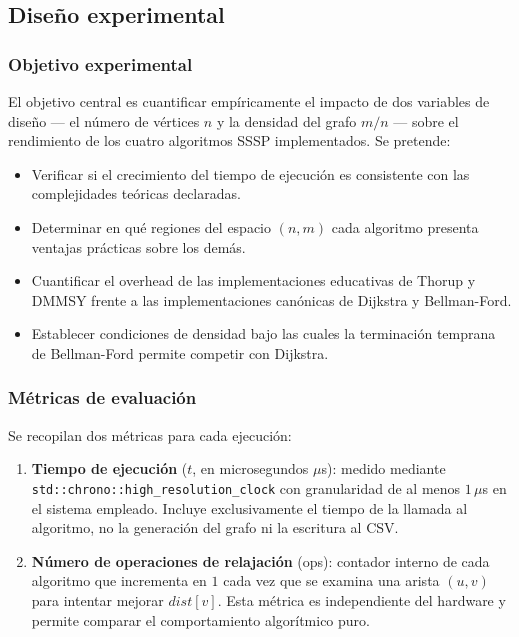 
\subsection{Diseño experimental}

\subsubsection{Objetivo experimental}

El objetivo central es cuantificar empíricamente el impacto de dos variables
de diseño — el número de vértices $n$ y la densidad del grafo $m/n$ — sobre
el rendimiento de los cuatro algoritmos SSSP implementados.
Se pretende:

\begin{itemize}
  \item Verificar si el crecimiento del tiempo de ejecución es consistente
    con las complejidades teóricas declaradas.
  \item Determinar en qué regiones del espacio $(n, m)$ cada algoritmo
    presenta ventajas prácticas sobre los demás.
  \item Cuantificar el overhead de las implementaciones educativas de Thorup
    y DMMSY frente a las implementaciones canónicas de Dijkstra y Bellman-Ford.
  \item Establecer condiciones de densidad bajo las cuales la terminación
    temprana de Bellman-Ford permite competir con Dijkstra.
\end{itemize}

\subsubsection{Métricas de evaluación}

Se recopilan dos métricas para cada ejecución:

\begin{enumerate}
  \item \textbf{Tiempo de ejecución} ($t$, en microsegundos $\mu$s):
    medido mediante \lstinline{std::chrono::high_resolution_clock} con
    granularidad de al menos $1\,\mu$s en el sistema empleado. Incluye
    exclusivamente el tiempo de la llamada al algoritmo, no la generación
    del grafo ni la escritura al CSV.

  \item \textbf{Número de operaciones de relajación} (ops):
    contador interno de cada algoritmo que incrementa en $1$ cada vez
    que se examina una arista $(u, v)$ para intentar mejorar
    $\textit{dist}[v]$. Esta métrica es independiente del hardware y
    permite comparar el comportamiento algorítmico puro.
\end{enumerate}

